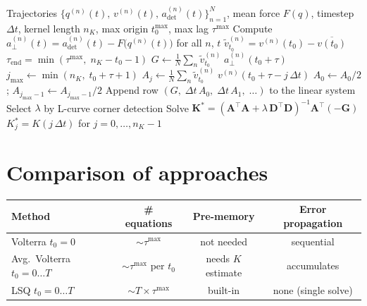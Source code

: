 \documentclass[11pt]{article}
\newcommand{\dt}{\Delta t}
\begin{document}
\begin{algorithm}[H]
\caption{Multi-origin least-squares kernel extraction}
\begin{algorithmic}[1]
\REQUIRE Trajectories $\{q^{(n)}(t),\, v^{(n)}(t),\, a_{\mathrm{det}}^{(n)}(t)\}_{n=1}^N$,
         mean force $F(q)$, timestep $\dt$, kernel length $n_K$,
         max origin $t_0^{\max}$, max lag $\tau^{\max}$
\STATE Compute $a_{\perp}^{(n)}(t) = a_{\mathrm{det}}^{(n)}(t) - F\bigl(q^{(n)}(t)\bigr)$
       for all $n$, $t$
\FOR{$t_0 = 0,\, \dt,\, \ldots,\, t_0^{\max}$}
  \STATE $\tilde v_{t_0}^{(n)} = v^{(n)}(t_0) - \overline{v(t_0)}$
         \hfill{}
  \STATE $\tau_{\mathrm{end}} = \min(\tau^{\max},\; n_K - t_0 - 1)$
  \FOR{$\tau = \dt,\, 2\dt,\, \ldots,\, \tau_{\mathrm{end}}$}
    \STATE $G \leftarrow \frac{1}{N}\sum_n \tilde v_{t_0}^{(n)}\; a_{\perp}^{(n)}(t_0+\tau)$
    \STATE $j_{\max} \leftarrow \min(n_K,\; t_0 + \tau + 1)$
      \STATE $A_j \leftarrow \frac{1}{N}\sum_n \tilde v_{t_0}^{(n)}\; v^{(n)}(t_0+\tau - j\,\dt)$
    \ENDFOR
    \STATE $A_0 \leftarrow A_0/2$;\; $A_{j_{\max}-1} \leftarrow A_{j_{\max}-1}/2$
           \hfill{}
    \STATE Append row $(G,\; \dt\,A_0,\; \dt\,A_1,\;\ldots)$ to the linear system
  \ENDFOR
\ENDFOR
\STATE Select $\lambda$ by L-curve corner detection
\STATE Solve $\bm{K}^* = (\bm{A}^\top\bm{A} + \lambda\,\bm{D}^\top\bm{D})^{-1}\bm{A}^\top(-\bm{G})$
\RETURN $K_j^* = K(j\,\dt)$ for $j = 0, \ldots, n_K - 1$
\end{algorithmic}
\end{algorithm}

\section{Comparison of approaches}

\begin{center}
\begin{tabular}{l c c c}
\hline
Method & \# equations & Pre-memory & Error propagation \\
\hline
Volterra $t_0=0$ & $\sim\tau^{\max}$ & not needed & sequential \\
Avg.\ Volterra $t_0=0\ldots T$ & $\sim\tau^{\max}$ per $t_0$ & needs $K$ estimate & accumulates \\
LSQ $t_0=0\ldots T$ & $\sim T \times \tau^{\max}$ & built-in & none (single solve) \\
\hline
\end{tabular}
\end{center}
\end{document}
